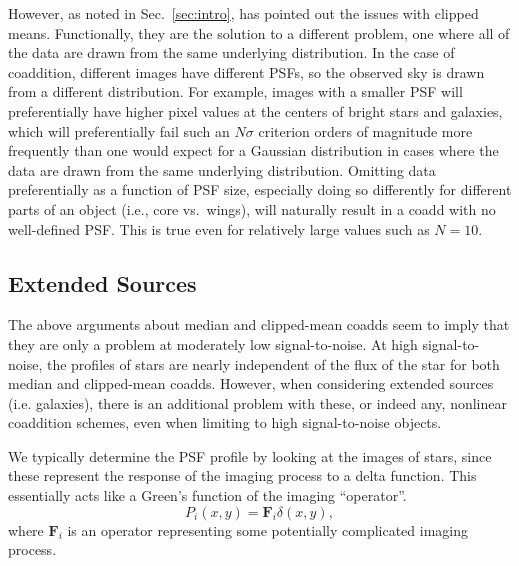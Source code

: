 \documentclass{aastex63}
\begin{document}
However, as noted in Sec.~\ref{sec:intro}, \citet{2018PASJ...70S...5B} has pointed out the issues with clipped means.  Functionally, they are the solution to a different problem, one where all of the data are drawn from the same underlying distribution.  In the case of coaddition, different images have different PSFs, so the observed sky is drawn from a different distribution.  For example, images with a smaller PSF will preferentially have higher pixel values at the centers of bright stars and galaxies, which will preferentially fail such an $N\sigma$ criterion orders of magnitude more frequently than one would expect for a Gaussian distribution in cases where the data are drawn from the same underlying distribution.  Omitting data preferentially as a function of PSF size, especially doing so differently for different parts of an object (i.e., core vs.\ wings), will naturally result in a coadd with no well-defined PSF. This is true even for relatively large values such as $N=10$.  

\subsection{Extended Sources}

The above arguments about median and clipped-mean coadds seem to imply that they are only a
problem at moderately low signal-to-noise.  At high signal-to-noise, the profiles of stars are nearly
independent of the flux of the star for both median and clipped-mean coadds.  
However, when considering extended sources (i.e. galaxies),
there is an additional problem with these, or indeed any, nonlinear coaddition schemes,
even when limiting to high signal-to-noise objects.

We typically determine the PSF profile by looking at the images of stars, since these represent
the response of the imaging process to a delta function.  This essentially acts like a
Green's function of the imaging ``operator''.
\begin{equation}
    P_i(x,y) = \mathbf{F}_i \delta(x,y),
\end{equation}
where $\mathbf{F}_i$ is an operator representing some potentially complicated imaging process.
\end{document}
